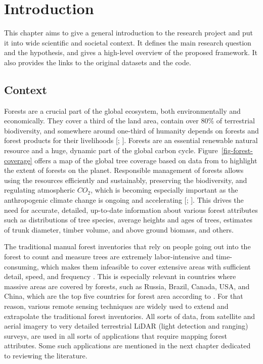\chapter{Introduction}\label{cap:introduction}

This chapter aims to give a general introduction to the research project and put it into wide scientific and societal context.
It defines the main research question and the hypothesis, and gives a high-level overview of the proposed framework.
It also provides the links to the original datasets and the code.

\section{Context}
Forests are a crucial part of the global ecosystem, both environmentally and economically.
They cover a third of the land area, contain over 80\% of terrestrial biodiversity, and somewhere around one-third of humanity depends on forests and forest products for their livelihoods [\citet{aertsForestRestorationBiodiversity2011}; \citet{StateWorldsForests2020}].
Forests are an essential renewable natural resource and a huge, dynamic part of the global carbon cycle.
Figure~\ref{fig-forest-coverage} offers a map of the global tree coverage based on data from \citet{hansenHighResolutionGlobalMaps2013} to highlight the extent of forests on the planet.
Responsible management of forests allows using the resources efficiently and sustainably, preserving the biodiversity, and regulating atmospheric $CO_2$, which is becoming especially important as the anthropogenic climate change is ongoing and accelerating [\citet{faheyForestCarbonStorage2010}; \citet{forsterIndicatorsGlobalClimate2024}].
This drives the need for accurate, detailed, up-to-date information about various forest attributes such as distributions of tree species, average heights and ages of trees, estimates of trunk diameter, timber volume, and above ground biomass, and others.

The traditional manual forest inventories that rely on people going out into the forest to count and measure trees are extremely labor-intensive and time-consuming, which makes them infeasible to cover extensive areas with sufficient detail, speed, and frequency \citep{burleyEncyclopediaForestSciences2004}.
This is especially relevant in countries where massive areas are covered by forests, such as Russia, Brazil, Canada, USA, and China, which are the top five countries for forest area according to \citet{GlobalForestResources2020}.
For that reason, various remote sensing techniques are widely used to extend and extrapolate the traditional forest inventories.
All sorts of data, from satellite and aerial imagery to very detailed terrestrial LiDAR (light detection and ranging) surveys, are used in all sorts of applications that require mapping forest attributes.
Some such applications are mentioned in the next chapter dedicated to reviewing the literature.

